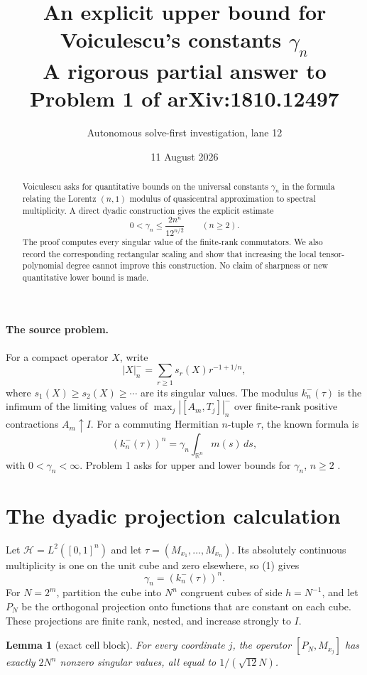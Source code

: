 \documentclass[11pt]{article}
\title{An explicit upper bound for Voiculescu's constants $\gamma_n$\\
\large A rigorous partial answer to Problem 1 of arXiv:1810.12497}
\author{Autonomous solve-first investigation, lane 12}
\date{11 August 2026}
\newtheorem{lemma}[theorem]{Lemma}
\newcommand{\Hh}{\mathcal H}
\newcommand{\R}{\mathbb R}
\begin{document}
\maketitle

\begin{abstract}
Voiculescu asks for quantitative bounds on the universal constants $\gamma_n$
in the formula relating the Lorentz $(n,1)$ modulus of quasicentral
approximation to spectral multiplicity.  A direct dyadic construction gives
the explicit estimate
\[
                 0<\gamma_n\le \frac{2n^n}{12^{n/2}}
                 \qquad(n\ge2).
\]
The proof computes every singular value of the finite-rank commutators.  We
also record the corresponding rectangular scaling and show that increasing
the local tensor-polynomial degree cannot improve this construction.  No
claim of sharpness or new quantitative lower bound is made.
\end{abstract}

\paragraph{The source problem.}
For a compact operator $X$, write
\[
 |X|_n^-=\sum_{r\ge1}s_r(X)r^{-1+1/n},
\]
where $s_1(X)\ge s_2(X)\ge\cdots$ are its singular values.  The modulus
$k_n^-(\tau)$ is the infimum of the limiting values of
$\max_j|[A_m,T_j]|_n^-$ over finite-rank positive contractions
$A_m\uparrow I$.  For a commuting Hermitian $n$-tuple $\tau$, the known
formula is
\[
 (k_n^-(\tau))^n=\gamma_n\int_{\R^n}m(s)\,ds,
 \tag{1}\label{eq:universal}
\]
with $0<\gamma_n<\infty$.  Problem 1 asks for upper and lower bounds for
$\gamma_n$, $n\ge2$ \cite[p.~21]{V}.

\section{The dyadic projection calculation}

Let $\Hh=L^2([0,1]^n)$ and let
$\tau=(M_{x_1},\ldots,M_{x_n})$.  Its absolutely continuous multiplicity is
one on the unit cube and zero elsewhere, so (1) gives
\[
                         \gamma_n=(k_n^-(\tau))^n.       \tag{2}
\]
For $N=2^m$, partition the cube into $N^n$ congruent cubes of side
$h=N^{-1}$, and let $P_N$ be the orthogonal projection onto functions that
are constant on each cube.  These projections are finite rank, nested, and
increase strongly to $I$.

\begin{lemma}[exact cell block]\label{lem:block}
For every coordinate $j$, the operator $[P_N,M_{x_j}]$ has exactly $2N^n$
nonzero singular values, all equal to $1/(\sqrt{12}N)$.
\end{lemma}
\end{document}
